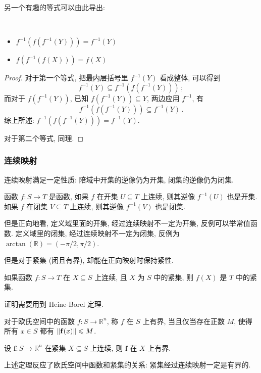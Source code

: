 \documentclass[UTF8]{ctexart}
\theoremstyle{mystyle}
\newcommand{\ve}[1]{\boldsymbol{\mathbf{#1}}}
\newcommand{\R}{\mathbb R}
\DeclarePairedDelimiter\norm{\lVert}{\rVert}
\begin{document}
另一个有趣的等式可以由此导出:
\begin{proposition} \

    \begin{itemize}
        \item $ f^{-1}(f(f^{-1}(Y))) = f^{-1}(Y) $
        \item $ f(f^{-1}(f(X))) = f(X) $
    \end{itemize}
\end{proposition}

\begin{proof}
    对于第一个等式, 把最内层括号里 $ f^{-1}(Y) $ 看成整体, 可以得到 \[ f^{-1}(Y) \subseteq f^{-1}(f(f^{-1}(Y))) \,;\] 而对于 $ f(f^{-1}(Y)) $, 已知 $ f(f^{-1}(Y)) \subseteq Y $, 两边应用 $ f^{-1} $, 有 \[ f^{-1}(f(f^{-1}(Y))) \subseteq f^{-1}(Y) \,.\] 综上所述: $ f^{-1}(f(f^{-1}(Y))) = f^{-1}(Y) $.

    对于第二个等式, 同理.
\end{proof}


\subsubsection{连续映射}
连续映射满足一定性质: 陪域中开集的逆像仍为开集, 闭集的逆像仍为闭集.

\begin{proposition}
    函数 $ f \colon S \to T $ 是函数, 如果 $ f $ 在开集 $ U \subseteq T $ 上连续, 则其逆像 $ f^{-1}(U) $ 也是开集. 如果 $ f $ 在闭集 $ V \subseteq T $ 上连续, 则其逆像 $ f^{-1}(V) $ 也是闭集.
\end{proposition}

但是正向地看, 定义域里面的开集, 经过连续映射不一定为开集, 反例可以举常值函数. 定义域里的闭集, 经过连续映射不一定为闭集, 反例为 $ \arctan(\R) = (-\pi/2, \pi/2) $.

但是对于紧集 (闭且有界), 却能在正向映射时保持紧性.

\begin{proposition}
    如果函数 $ f \colon S \to T $ 在 $ X \subseteq S $ 上连续, 且 $ X $ 为 $ S $ 中的紧集, 则 $ f(X) $ 是 $ T $ 中的紧集.
\end{proposition}

证明需要用到 Heine-Borel 定理.

\begin{definition}
    对于欧氏空间中的函数 $ f \colon S \to \R^n $, 称 $ f $ 在 $ S $ 上有界, 当且仅当存在正数 $ M $, 使得所有 $ x \in S $ 都有 $ \norm{\ve f(x)} \leqslant M $.
\end{definition}

\begin{theorem}
    设 $ \ve f \colon S \to \R^n $ 在紧集 $ X \subseteq S $ 上连续, 则 $ \ve f $ 在 $ X $ 上有界.
\end{theorem}

上述定理反应了欧氏空间中函数和紧集的关系: 紧集经过连续映射一定是有界的.
\end{document}
